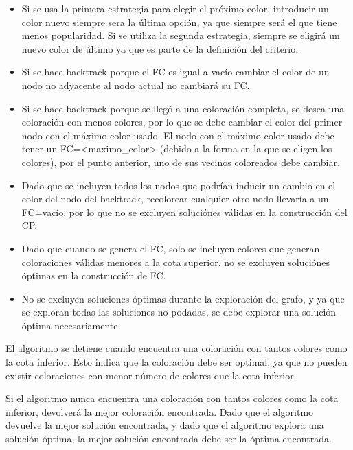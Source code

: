 \documentclass[a4paper,10pt]{article}
\begin{document}
\begin{itemize}
 \item Si se usa la primera estrategia para elegir el pr\'oximo color,
       introducir un color nuevo siempre sera la \'ultima opci\'on, ya que
       siempre ser\'a el que tiene menos popularidad. Si se utiliza la segunda
       estrategia, siempre se eligir\'a un nuevo color de \'ultimo ya que es
       parte de la definici\'on del criterio.\\
 \item Si se hace backtrack porque el FC es igual a vac\'io cambiar el
       color de un nodo no adyacente al nodo actual no cambiar\'a su FC.\\
 \item Si se hace backtrack porque se lleg\'o a una coloraci\'on
       completa, se desea una coloraci\'on con menos colores, por lo que se
       debe cambiar el color del primer nodo con el m\'aximo color usado. El nodo
       con el m\'aximo color usado debe tener un FC={<maximo\_color>}
       (debido a la forma en la que se eligen los colores), por el
       punto anterior, uno de sus vecinos coloreados debe cambiar.
 \item Dado que se incluyen todos los nodos que podr\'ian inducir un
       cambio en el color del nodo del backtrack, recolorear cualquier otro
       nodo llevar\'ia a un FC=vac\'io, por lo que no se excluyen soluci\'ones
       v\'alidas en la construcci\'on del CP.
 \item Dado que cuando se genera el FC, solo se incluyen colores que
       generan coloraciones v\'alidas menores a la cota superior, no se
       excluyen soluci\'ones \'optimas en la construcci\'on de FC.
 \item No se excluyen soluciones \'optimas durante la exploraci\'on del
       grafo, y ya que se exploran todas las soluciones no podadas, se
       debe explorar una soluci\'on \'optima necesariamente.
\end{itemize}

El algoritmo se detiene cuando encuentra una coloraci\'on con tantos
colores como la cota inferior. Esto indica que la coloraci\'on debe ser
optimal, ya que no pueden existir coloraciones con menor n\'umero de
colores que la cota inferior.

Si el algoritmo nunca encuentra una coloraci\'on con tantos colores como
la cota inferior, devolver\'a la mejor coloraci\'on encontrada. Dado que
el algoritmo devuelve la mejor soluci\'on encontrada, y dado que el
algoritmo explora una soluci\'on \'optima, la mejor soluci\'on
encontrada debe ser la \'optima encontrada.
\end{document}
